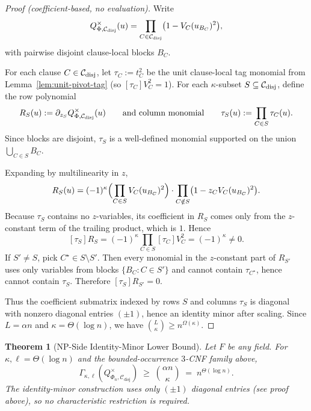 \documentclass[12pt]{article}
\newtheorem{theorem}{Theorem}
\theoremstyle{definition}
\theoremstyle{definition}
\theoremstyle{remark}
\theoremstyle{remark}
\begin{document}
\begin{proof}[Proof (coefficient-based, no evaluation)]
Write
\[
Q^\times_{\Phi,\mathcal{C}_{\rm disj}}(u)=\prod_{C\in \mathcal{C}_{\rm disj}}\bigl(1-V_C(u_{B_C})^2\bigr),
\]
with pairwise disjoint clause-local blocks $B_C$.

For each clause $C\in \mathcal{C}_{\rm disj}$, let $\tau_C:=t_C^2$ be the unit clause-local tag
monomial from Lemma~\ref{lem:unit-pivot-tag} (so $[\tau_C]V_C^2=1$).
For each $\kappa$-subset $S\subseteq \mathcal{C}_{\rm disj}$, define the row polynomial
\[
R_S(u):=\partial_{z_S}Q^\times_{\Phi,\mathcal{C}_{\rm disj}}(u)
\qquad\text{and column monomial}\qquad
\tau_S(u):=\prod_{C\in S}\tau_C(u).
\]
Since blocks are disjoint, $\tau_S$ is a well-defined monomial supported on the union
$\bigcup_{C\in S} B_C$.

Expanding by multilinearity in $z$,
\[
R_S(u) = (-1)^\kappa\Bigl(\prod_{C\in S} V_C(u_{B_C})^2\Bigr)\cdot
\prod_{C\notin S}\bigl(1-z_C V_C(u_{B_C})^2\bigr).
\]
Because $\tau_S$ contains no $z$-variables, its coefficient in $R_S$ comes only from the
$z$-constant term of the trailing product, which is $1$. Hence
\[
[\tau_S]R_S = (-1)^\kappa\prod_{C\in S}[\tau_C]V_C^2 = (-1)^\kappa\neq 0.
\]
If $S'\neq S$, pick $C^\star\in S\setminus S'$. Then every monomial in the $z$-constant
part of $R_{S'}$ uses only variables from blocks $\{B_C:C\in S'\}$ and cannot contain
$\tau_{C^\star}$, hence cannot contain $\tau_S$. Therefore $[\tau_S]R_{S'}=0$.

Thus the coefficient submatrix indexed by rows $S$ and columns $\tau_S$ is diagonal with
nonzero diagonal entries $(\pm 1)$, hence an identity minor after scaling.
Since $L=\alpha n$ and $\kappa=\Theta(\log n)$, we have $\binom{L}{\kappa}\ge n^{\Omega(\kappa)}$.
\end{proof}

\begin{theorem}[NP-Side Identity-Minor Lower Bound]\label{thm:np-identity-minor-main}
Let $F$ be \emph{any} field. For $\kappa,\ell=\Theta(\log n)$ and the bounded-occurrence $3$-CNF family above,
\[
\Gamma_{\kappa,\ell}(Q_{\Phi_n,\mathcal{C}_\mathrm{disj}}^{\times}) \;\ge\; \binom{\alpha n}{\kappa} \;=\; n^{\Theta(\log n)}.
\]
The identity-minor construction uses only $(\pm 1)$ diagonal entries (see proof above),
so no characteristic restriction is required.
\end{theorem}

\end{document}
